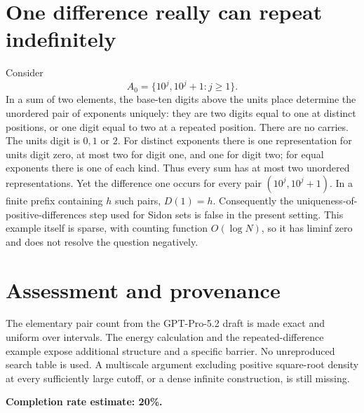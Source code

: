 \documentclass[11pt]{article}
\begin{document}
\section*{One difference really can repeat indefinitely}
Consider
\[
 A_0=\{10^j,10^j+1:j\ge1\}.
\]
In a sum of two elements, the base-ten digits above the units place determine the unordered pair of exponents uniquely: they are two digits equal to one at distinct positions, or one digit equal to two at a repeated position. There are no carries. The units digit is $0,1$ or $2$. For distinct exponents there is one representation for units digit zero, at most two for digit one, and one for digit two; for equal exponents there is one of each kind. Thus every sum has at most two unordered representations.
Yet the difference one occurs for every pair $(10^j,10^j+1)$. In a finite prefix containing $h$ such pairs, $D(1)=h$. Consequently the uniqueness-of-positive-differences step used for Sidon sets is false in the present setting. This example itself is sparse, with counting function $O(\log N)$, so it has liminf zero and does not resolve the question negatively.

\section*{Assessment and provenance}
The elementary pair count from the GPT-Pro-5.2 draft is made exact and uniform over intervals. The energy calculation and the repeated-difference example expose additional structure and a specific barrier. No unreproduced search table is used. A multiscale argument excluding positive square-root density at every sufficiently large cutoff, or a dense infinite construction, is still missing.

\textbf{Completion rate estimate: 20\%.}
\end{document}
